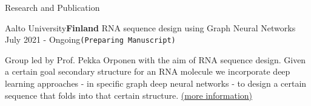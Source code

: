 \documentclass{resume} %
\begin{document}
\begin{rSection}{Research and Publication}

\begin{rSubsection}{Aalto University}{\textcolor{Black!70}{\bf Finland}}
{RNA sequence design using Graph Neural Networks}
{\textcolor{Black!70}{July 2021 - Ongoing}}{\tt (Preparing Manuscript)}
\begin{small}
\item Group led by Prof. Pekka Orponen with the aim of RNA sequence design. Given a certain goal secondary structure for an RNA molecule we incorporate deep learning approaches - in specific graph deep neural networks - to design a certain sequence that folds into that certain structure. \href{https://hamidrezakmk.github.io/research.html}{(\underline{more information})}
\end{small}
\end{rSubsection}



\end{rSection}
\end{document}
